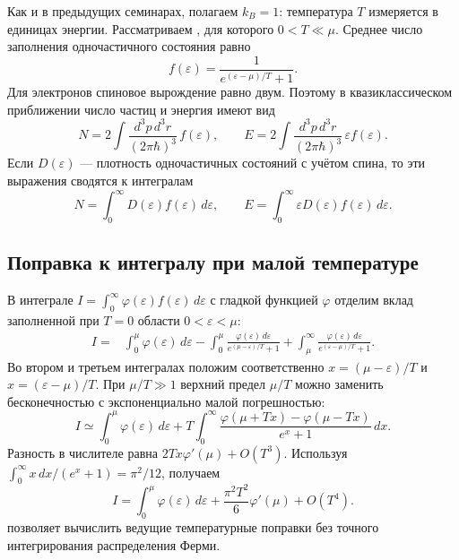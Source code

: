 \documentclass[../final.tex]{subfiles}
\begin{document}


Как и в предыдущих семинарах, полагаем $k_B=1$: температура $T$
измеряется в единицах энергии. Рассматриваем
, для которого
$0<T\ll\mu$. Среднее число заполнения одночастичного состояния равно
\[
f(\varepsilon)=\frac{1}{e^{(\varepsilon-\mu)/T}+1}.
\]
Для электронов спиновое вырождение равно двум. Поэтому в
квазиклассическом приближении число частиц и энергия имеют вид
\[
N=2\int\frac{d^3p\,d^3r}{(2\pi\hbar)^3}\,f(\varepsilon),\qquad
    E=2\int\frac{d^3p\,d^3r}{(2\pi\hbar)^3}\,
    \varepsilon f(\varepsilon).
\]
Если $D(\varepsilon)$ --- плотность одночастичных состояний с учётом
спина, то эти выражения сводятся к интегралам
\[
N=\int_0^\infty D(\varepsilon)f(\varepsilon)\,d\varepsilon,
    \qquad
    E=\int_0^\infty\varepsilon D(\varepsilon)f(\varepsilon)\,d\varepsilon.
\]

\subsection*{Поправка к интегралу при малой температуре}

В интеграле $I=\int_0^\infty\varphi(\varepsilon)f(\varepsilon)\,d\varepsilon$
с гладкой функцией $\varphi$ отделим вклад заполненной при $T=0$
области $0<\varepsilon<\mu$:
\begin{align*}
    I={}&\int_0^\mu\varphi(\varepsilon)\,d\varepsilon
    -\int_0^\mu\frac{\varphi(\varepsilon)\,d\varepsilon}
    {e^{(\mu-\varepsilon)/T}+1}
    +\int_\mu^\infty\frac{\varphi(\varepsilon)\,d\varepsilon}
    {e^{(\varepsilon-\mu)/T}+1}.
\end{align*}
Во втором и третьем интегралах положим соответственно
$x=(\mu-\varepsilon)/T$ и $x=(\varepsilon-\mu)/T$.
При $\mu/T\gg1$ верхний предел $\mu/T$ можно заменить бесконечностью
с экспоненциально малой погрешностью:
\[
I\simeq\int_0^\mu\varphi(\varepsilon)\,d\varepsilon
    +T\int_0^\infty
    \frac{\varphi(\mu+Tx)-\varphi(\mu-Tx)}{e^x+1}\,dx.
\]
Разность в числителе равна $2Tx\varphi'(\mu)+O(T^3)$.
Используя $\int_0^\infty x\,dx/(e^x+1)=\pi^2/12$, получаем
\[
I=\int_0^\mu\varphi(\varepsilon)\,d\varepsilon
    +\frac{\pi^2T^2}{6}\varphi'(\mu)+O(T^4).
\]
 позволяет вычислить ведущие
температурные поправки без точного интегрирования распределения Ферми.
\end{document}
